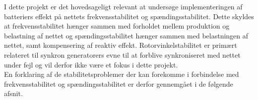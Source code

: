 I dette projekt er det hovedsageligt relevant at undersøge implementeringen af batteriers effekt på nettets frekvensstabilitet og spændingsstabilitet. Dette skyldes at frekvensstabilitet hænger sammen med forholdet mellem produktion og belastning af nettet og spændingsstabilitet hænger sammen med belastningen af nettet, samt kompensering af reaktiv effekt. Rotorvinkelstabilitet er primært relateret til synkron generatorers evne til at forblive synkroniseret med nettet under fejl og vil derfor ikke være et fokus i dette projekt. \\
En forklaring af de stabilitetsproblemer der kan forekomme i forbindelse med frekvensstabilitet og spændingsstabilitet er derfor gennemgået i de følgende afsnit.